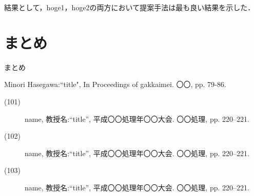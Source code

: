\documentclass[twocolumn]{jarticle}
\begin{document}
結果として，hoge1，hoge2の両方において提案手法は最も良い結果を示した．

\vspace{-6mm}
\section{まとめ}
\vspace{-2mm}
まとめ

\vspace{-6mm}
\begin{scriptsize}

\begin{thebibliography}{10}
 Minori Hasegawa:“title", In Proceedings of gakkaimei. 〇〇, pp. 79-86.

\end{thebibliography}
\vspace{3mm}
\vspace{-3mm}
\begin{large}
\end{large}
\begin{description}
\item[(101)] name, 教授名:“title”, 平成〇〇処理年〇〇大会. 〇〇処理, pp. 220–221.
\item[(102)] name, 教授名:“title”, 平成〇〇処理年〇〇大会. 〇〇処理, pp. 220–221.
\item[(103)] name, 教授名:“title”, 平成〇〇処理年〇〇大会. 〇〇処理, pp. 220–221.
\end{description}
\end{scriptsize}
\end{document}
